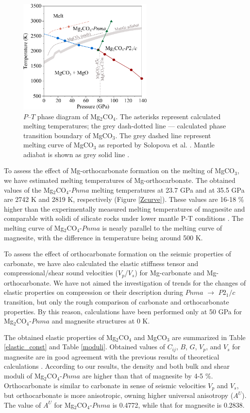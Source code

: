\documentclass[a4paperm]{article}
\begin{document}
\begin{figure}[H]
	\centering
	\includegraphics[width=0.6\textwidth]{phdia_mg2co4}
	\caption{$P$--$T$ phase diagram of Mg$_2$CO$_4$. The asterisks represent calculated melting temperatures;  the grey dash-dotted line --- calculated phase transition boundary of MgCO$_3$. The grey dashed line represent melting curve of MgCO$_3$ as reported by Solopova et al. \cite{solopova2015}. Mantle adiabat is shown as grey solid line \cite{katsura2010}.} 
\label{phdia}
\end{figure}

To assess the effect of Mg-orthocarbonate formation on the melting of MgCO$_3$, we have estimated melting temperatures of Mg-orthocarbonate.
The obtained values of the Mg$_2$CO$_4$-$Pnma$ melting temperatures at 23.7 GPa and at 35.5 GPa are 2742 K and 2819 K, respectively (Figure \ref{Zcurve}).
These values are 16-18 \% higher than the experimentally measured melting temperatures of magnesite  and comparable with solidi of silicate rocks under lower mantle P-T conditions \cite{litasov2018_review}.
The melting curve of Mg$_2$CO$_4$-$Pnma$ is nearly parallel to the melting curve of magnesite, with the difference in temperature being around 500 K.


To assess the effect of orthocarbonate formation on the seismic properties of carbonate, we have also calculated the elastic stiffness tensor and compressional/shear sound velocities ($V_p$/$V_s$) for Mg-carbonate and Mg-orthocarbonate.
We have not aimed the investigation of trends for the changes of elastic properties on compression or their description during $Pnma$ $\to$ $P2_1/c$ transition, but only the rough comparison of carbonate and orthocarbonate properties.
By this reason, calculations have been performed only at 50 GPa for Mg$_2$CO$_4$-$Pnma$ and magnesite structures at 0 K.

The obtained elastic properties of Mg$_2$CO$_4$ and MgCO$_3$ are summarized in Table \ref{elastic_const} and Table \ref{moduli}.
Obtained values of $C_{ij}$, $B$, $G$, $V_p$, and $V_s$ for magnesite are in good agreement with the previous results of theoretical calculations \cite{li2020_mgco3}.
According to our results, the density and both bulk and shear moduli of Mg$_2$CO$_4$-$Pnma$ are higher than that of magnesite by 4-5 \%.
Orthocarbonate is similar to carbonate in sense of seismic velocities $V_p$ and $V_s$, but orthocarbonate is more anisotropic, owning higher universal anisotropy ($A^U$).
The value of $A^U$ for Mg$_2$CO$_4$-$Pnma$ is 0.4772, while that for magnesite is 0.2838.
\end{document}
